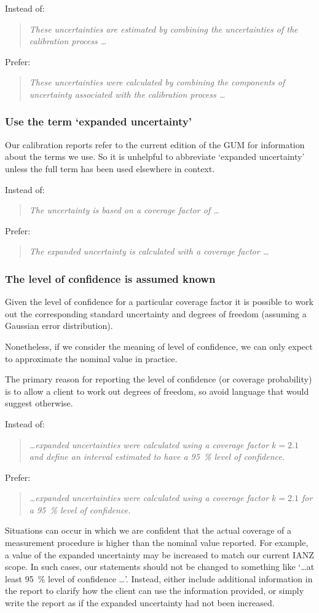 Instead of:
\begin{quote}\textit{
These uncertainties are estimated by combining the uncertainties of the calibration process \ldots}
\end{quote} 
Prefer:
\begin{quote}\textit{
These uncertainties were calculated by combining the components of uncertainty associated with the calibration process \ldots} 
\end{quote}

\subsubsection{Use the term `expanded uncertainty'}
Our calibration reports refer to the current edition of the GUM for information about the terms we use. So it is unhelpful to abbreviate `expanded uncertainty' unless the full term has been used elsewhere in context.  
 
Instead of:
\begin{quote}\textit{
The uncertainty is based on a coverage factor of \ldots}
\end{quote} 
Prefer:
\begin{quote}\textit{
The expanded uncertainty is calculated with a coverage factor \ldots} 
\end{quote}

\subsubsection{The level of confidence is assumed known}
Given the level of confidence for a particular coverage factor it is possible to work out the corresponding standard uncertainty and degrees of freedom (assuming a Gaussian error distribution).
 
Nonetheless, if we consider the meaning of level of confidence, we can only expect to approximate the nominal value in practice.

The primary reason for reporting the level of confidence (or coverage probability) is to allow a client to work out degrees of freedom, so avoid language that would suggest otherwise.

Instead of:
\begin{quote}\textit{
\ldots expanded uncertainties were calculated using a coverage factor $k =2.1$ and define an interval estimated to have a \SI{95}{\%} level of confidence.}
\end{quote} 
Prefer:
\begin{quote}\textit{
\ldots expanded uncertainties were calculated using a coverage factor $k = 2.1$ for a \SI{95}{\%} level of confidence.} 
\end{quote}

Situations can occur in which we are confident that the actual coverage of a measurement procedure is higher than the nominal value reported. For example, a value of the expanded uncertainty may be increased to match our current IANZ scope. In such cases, our statements should not be changed to something like `\ldots at least \SI{95}{\%} level of confidence \ldots'. Instead, either include additional information in the report to clarify how the client can use the information provided, or simply write the report as if the expanded uncertainty had not been increased.
